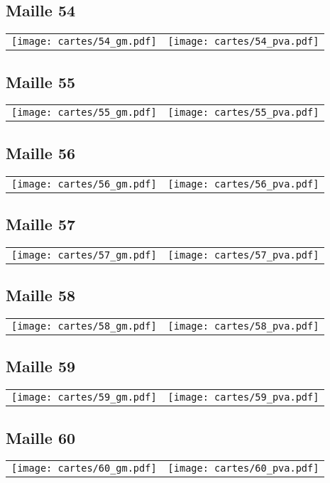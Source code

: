 \subsection{Maille 54}
\begin{tabular}{ll}
\texttt{[image: cartes/54\_gm.pdf]}
&
\texttt{[image: cartes/54\_pva.pdf]}
\end{tabular}
\newpage
\subsection{Maille 55}
\begin{tabular}{ll}
\texttt{[image: cartes/55\_gm.pdf]}
&
\texttt{[image: cartes/55\_pva.pdf]}
\end{tabular}
\newpage
\subsection{Maille 56}
\begin{tabular}{ll}
\texttt{[image: cartes/56\_gm.pdf]}
&
\texttt{[image: cartes/56\_pva.pdf]}
\end{tabular}
\newpage
\subsection{Maille 57}
\begin{tabular}{ll}
\texttt{[image: cartes/57\_gm.pdf]}
&
\texttt{[image: cartes/57\_pva.pdf]}
\end{tabular}
\newpage
\subsection{Maille 58}
\begin{tabular}{ll}
\texttt{[image: cartes/58\_gm.pdf]}
&
\texttt{[image: cartes/58\_pva.pdf]}
\end{tabular}
\newpage
\subsection{Maille 59}
\begin{tabular}{ll}
\texttt{[image: cartes/59\_gm.pdf]}
&
\texttt{[image: cartes/59\_pva.pdf]}
\end{tabular}
\newpage
\subsection{Maille 60}
\begin{tabular}{ll}
\texttt{[image: cartes/60\_gm.pdf]}
&
\texttt{[image: cartes/60\_pva.pdf]}
\end{tabular}
\newpage
